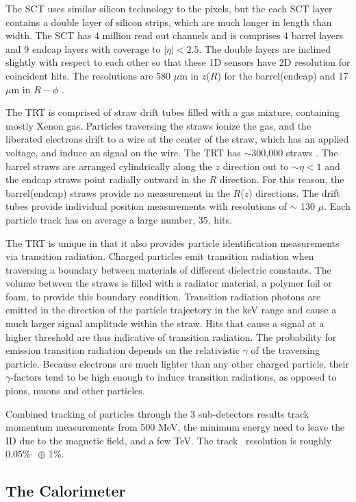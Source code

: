 The SCT uses similar silicon technology to the pixels, but the each SCT layer contains a double layer of silicon strips, which are much longer in length than width. The SCT has 4 million read out channels and is comprises 4 barrel layers and 9 endcap layers with coverage to $|\eta| < 2.5$. The double layers are inclined slightly with respect to each other so that these 1D sensors have 2D resolution for coincident hits. The resolutions are 580 $\mu$m in $z$($R$) for the barrel(endcap) and 17 $\mu$m in $R-\phi$ .

The TRT is comprised of straw drift tubes filled with a gas mixture, containing mostly Xenon gas. Particles traversing the straws ionize the gas, and the liberated electrons drift to a wire at the center of the straw, which has an applied voltage, and induce an signal on the wire. The TRT has $\sim$300,000 straws . The barrel straws are arranged cylindrically along the $z$ direction out to $\sim \eta < 1$ and the endcap straws point radially outward in the $R$ direction. For this reason, the barrel(endcap) straws provide no measurement in the $R$($z$) directions. The drift tubes provide individual position measurements with resolutions of $\sim$ 130 $\mu$. Each particle track has on average a large number, 35, hits. 

The TRT is unique in that it also provides particle identification measurements via transition radiation. Charged particles emit transition radiation when traversing a boundary between materials of different dielectric constants. The volume between the straws is filled with a radiator material, a polymer foil or foam, to provide this boundary condition. Transition radiation photons are emitted in the direction of the particle trajectory in the keV range and cause a much larger signal amplitude within the straw. Hits that cause a signal at a higher threshold are thus indicative of transition radiation.  The probability for emission transition radiation depends on the relativistic $\gamma$ of the traversing particle. Because electrons are much lighter than any other charged particle, their $\gamma$-factors tend to be high enough to induce transition radiations, as opposed to pions, muons and other particles. 

Combined tracking of particles through the 3 sub-detectors results track momentum measurements from 500 MeV, the minimum energy need to leave the ID due to the magnetic field, and a few TeV. The track \pt\ resolution is roughly 0.05\%$\cdot$\pt\ $\oplus$ 1\%.  

\subsection{The Calorimeter}

